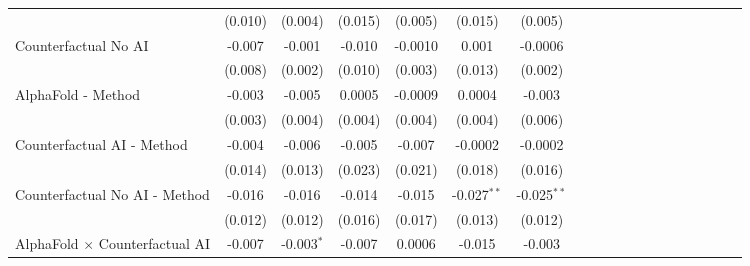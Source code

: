 \begin{tabular}{lcccccccccccccccccc}
                                                              & (0.010)     & (0.004)      & (0.015) & (0.005)  & (0.015)       & (0.005)       &       &       &       &       &       &       &       &       &      &      &      &   \\   
   Counterfactual No AI                                       & -0.007      & -0.001       & -0.010  & -0.0010  & 0.001         & -0.0006       &       &       &       &       &       &       &       &       &      &      &      &   \\   
                                                              & (0.008)     & (0.002)      & (0.010) & (0.003)  & (0.013)       & (0.002)       &       &       &       &       &       &       &       &       &      &      &      &   \\   
   AlphaFold - Method                                         & -0.003      & -0.005       & 0.0005  & -0.0009  & 0.0004        & -0.003        &       &       &       &       &       &       &       &       &      &      &      &   \\   
                                                              & (0.003)     & (0.004)      & (0.004) & (0.004)  & (0.004)       & (0.006)       &       &       &       &       &       &       &       &       &      &      &      &   \\   
   Counterfactual AI - Method                                 & -0.004      & -0.006       & -0.005  & -0.007   & -0.0002       & -0.0002       &       &       &       &       &       &       &       &       &      &      &      &   \\   
                                                              & (0.014)     & (0.013)      & (0.023) & (0.021)  & (0.018)       & (0.016)       &       &       &       &       &       &       &       &       &      &      &      &   \\   
   Counterfactual No AI - Method                              & -0.016      & -0.016       & -0.014  & -0.015   & -0.027$^{**}$ & -0.025$^{**}$ &       &       &       &       &       &       &       &       &      &      &      &   \\   
                                                              & (0.012)     & (0.012)      & (0.016) & (0.017)  & (0.013)       & (0.012)       &       &       &       &       &       &       &       &       &      &      &      &   \\   
   AlphaFold $\times$ Counterfactual AI                       & -0.007      & -0.003$^{*}$ & -0.007  & 0.0006   & -0.015        & -0.003        &       &       &       &       &       &       &       &       &      &      &      &   \\   

\end{tabular}
